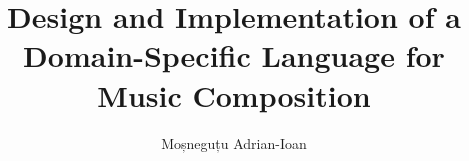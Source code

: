 \documentclass[12pt]{report}
\begin{document}
\title{Design and Implementation of a Domain-Specific Language for Music Composition}
\author{Moșneguțu Adrian-Ioan}

\hypersetup{pageanchor=false}
\maketitle

\newpage
\thispagestyle{empty}
\mbox{}
\newpage
{}
\hypersetup{pageanchor=true}



\tableofcontents

\newpage
{}










\end{document}

